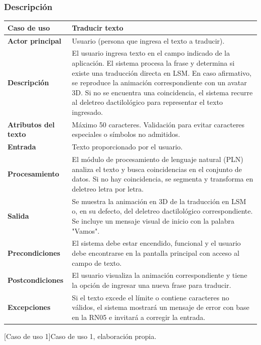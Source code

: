 \subsubsection{Descripción}

\noindent
\begin{tabularx}{\textwidth}{|l|X|}
\hline
\textbf{Caso de uso} & Traducir texto \\ \hline

\textbf{Actor principal} & Usuario (persona que ingresa el texto a traducir). \\ \hline

\textbf{Descripción} & El usuario ingresa texto en el campo indicado de la aplicación. El sistema procesa la frase y determina si existe una traducción directa en LSM. En caso afirmativo, se reproduce la animación correspondiente con un avatar 3D. Si no se encuentra una coincidencia, el sistema recurre al deletreo dactilológico para representar el texto ingresado. \\ \hline

\textbf{Atributos del texto} & Máximo 50 caracteres. Validación para evitar caracteres especiales o símbolos no admitidos. \\ \hline

\textbf{Entrada} & Texto proporcionado por el usuario. \\ \hline

\textbf{Procesamiento} & El módulo de procesamiento de lenguaje natural (PLN) analiza el texto y busca coincidencias en el conjunto de datos. Si no hay coincidencia, se segmenta y transforma en deletreo letra por letra. \\ \hline

\textbf{Salida} & Se muestra la animación en 3D de la traducción en LSM o, en su defecto, del deletreo dactilológico correspondiente. Se incluye un mensaje visual de inicio con la palabra "Vamos". \\ \hline

\textbf{Precondiciones} & El sistema debe estar encendido, funcional y el usuario debe encontrarse en la pantalla principal con acceso al campo de texto. \\ \hline

\textbf{Postcondiciones} & El usuario visualiza la animación correspondiente y tiene la opción de ingresar una nueva frase para traducir. \\ \hline

\textbf{Excepciones} & Si el texto excede el límite o contiene caracteres no válidos, el sistema mostrará un mensaje de error con base en la RN05 e invitará a corregir la entrada. \\ \hline
\end{tabularx}
[Caso de uso 1]{Caso de uso 1, elaboración propia.}


